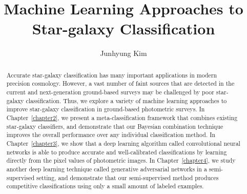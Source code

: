 \documentclass[12pt,edeposit,fullpage]{uiucthesis2014}
\begin{document}
\title{Machine Learning Approaches to\\
       Star-galaxy Classification}
\author{Junhyung Kim}
\phdthesis
{}
\maketitle

\frontmatter

\begin{abstract}
Accurate star-galaxy classification has many important applications in modern precision cosmology.
However, a vast number of faint sources that are detected in the current and
next-generation ground-based surveys may be challenged by poor star-galaxy classification.
Thus, we explore a variety of machine learning approaches to improve
star-galaxy classification in ground-based photometric surveys.
In Chapter~\ref{chapter2}, we present a meta-classification framework that combines existing star-galaxy classifiers,
and demonstrate that our Bayesian combination technique improves the overall performance over any individual classification method.
In Chapter~\ref{chapter3}, we show that a deep learning algorithm called convolutional neural networks
is able to produce accurate and well-calibrated classifications by learning directly from the pixel values of photometric images.
In Chapter~\ref{chapter4}, we study another deep learning technique called generative adversarial networks
in a semi-supervised setting, and demonstrate that our semi-supervised method produces competitive classifications
using only a small amount of labeled examples.

\end{abstract}


\end{document}
